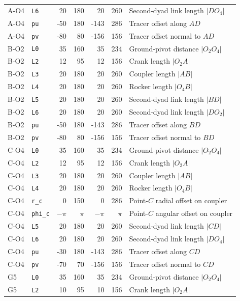 \begin{longtable}{@{}llrrrrp{4.3cm}@{}}
A-O4 & \texttt{L6} & 20 & 180 & 20 & 260 & Second-dyad link length $|DO_4|$ \\
A-O4 & \texttt{pu} & -50 & 180 & -143 & 286 & Tracer offset along $AD$ \\
A-O4 & \texttt{pv} & -80 & 80 & -156 & 156 & Tracer offset normal to $AD$ \\
\addlinespace
B-O2 & \texttt{L0} & 35 & 160 & 35 & 234 & Ground-pivot distance $|O_2O_4|$ \\
B-O2 & \texttt{L2} & 12 & 95 & 12 & 156 & Crank length $|O_2A|$ \\
B-O2 & \texttt{L3} & 20 & 180 & 20 & 260 & Coupler length $|AB|$ \\
B-O2 & \texttt{L4} & 20 & 180 & 20 & 260 & Rocker length $|O_4B|$ \\
B-O2 & \texttt{L5} & 20 & 180 & 20 & 260 & Second-dyad link length $|BD|$ \\
B-O2 & \texttt{L6} & 20 & 180 & 20 & 260 & Second-dyad link length $|DO_2|$ \\
B-O2 & \texttt{pu} & -50 & 180 & -143 & 286 & Tracer offset along $BD$ \\
B-O2 & \texttt{pv} & -80 & 80 & -156 & 156 & Tracer offset normal to $BD$ \\
\addlinespace
C-O4 & \texttt{L0} & 35 & 160 & 35 & 234 & Ground-pivot distance $|O_2O_4|$ \\
C-O4 & \texttt{L2} & 12 & 95 & 12 & 156 & Crank length $|O_2A|$ \\
C-O4 & \texttt{L3} & 20 & 180 & 20 & 260 & Coupler length $|AB|$ \\
C-O4 & \texttt{L4} & 20 & 180 & 20 & 260 & Rocker length $|O_4B|$ \\
C-O4 & \texttt{r\_c} & 0 & 150 & 0 & 286 & Point-$C$ radial offset on coupler \\
C-O4 & \texttt{phi\_c} & $-\pi$ & $\pi$ & $-\pi$ & $\pi$ & Point-$C$ angular offset on coupler \\
C-O4 & \texttt{L5} & 20 & 180 & 20 & 260 & Second-dyad link length $|CD|$ \\
C-O4 & \texttt{L6} & 20 & 180 & 20 & 260 & Second-dyad link length $|DO_4|$ \\
C-O4 & \texttt{pu} & -30 & 180 & -143 & 286 & Tracer offset along $CD$ \\
C-O4 & \texttt{pv} & -70 & 70 & -156 & 156 & Tracer offset normal to $CD$ \\
\addlinespace
G5 & \texttt{L0} & 35 & 160 & 35 & 234 & Ground-pivot distance $|O_2O_4|$ \\
G5 & \texttt{L2} & 10 & 95 & 10 & 156 & Crank length $|O_2A|$ \\

\end{longtable}
